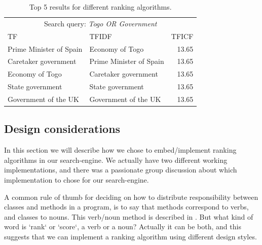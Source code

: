 \begin{table}
	\centering
\begin{tabular}{@{}llr@{}} \toprule
	\multicolumn{3}{c}{Search query: \textit{Togo OR Government}} \\ \cmidrule(r){1-3}
	TF 									& TFIDF 							& TFICF \\ \midrule
	Prime Minister of Spain 			& Economy of Togo 					& 13.65 \\
	Caretaker government 				& Prime Minister of Spain 			& 13.65 \\
	Economy of Togo		    			& Caretaker government 				& 13.65 \\
	State government 					& State government					& 13.65 \\
	Government of the UK 	& Government of the UK 	& 13.65 \\ \bottomrule
\end{tabular}
\caption{Top 5 results for different ranking algorithms.}	
\label{tab:comparisonRankingAlgorithms}
\end{table}


\subsection{Design considerations}
In this section we will describe how we chose to embed/implement ranking algorithms in our search-engine. We actually have two different working implementations, and there was a passionate group discussion about which implementation to chose for our search-engine.  

A common rule of thumb for deciding on how to distribute responsibility between classes and methods in a program, is to say that methods correspond to verbs, and classes to nouns. This verb/noun method is described in \cite[p.530]{BK}.
But what kind of word is `rank` or `score`, a verb or a noun? Actually it can be both, and this suggests that we can implement a ranking algorithm using different design styles.


